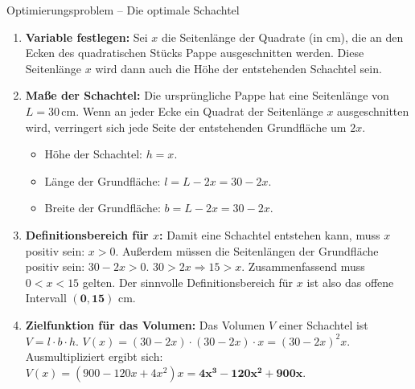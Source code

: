 \begin{loesungsumgebung}{Optimierungsproblem – Die optimale Schachtel}

\begin{enumerate}
    \item \textbf{Variable festlegen:}
    Sei $x$ die Seitenlänge der Quadrate (in cm), die an den Ecken des quadratischen Stücks Pappe ausgeschnitten werden. Diese Seitenlänge $x$ wird dann auch die Höhe der entstehenden Schachtel sein.

    \item \textbf{Maße der Schachtel:}
    Die ursprüngliche Pappe hat eine Seitenlänge von $L=30\,$cm. Wenn an jeder Ecke ein Quadrat der Seitenlänge $x$ ausgeschnitten wird, verringert sich jede Seite der entstehenden Grundfläche um $2x$.
    \begin{itemize}
        \item Höhe der Schachtel: $h = x$.
        \item Länge der Grundfläche: $l = L - 2x = 30 - 2x$.
        \item Breite der Grundfläche: $b = L - 2x = 30 - 2x$.
    \end{itemize}

    \item \textbf{Definitionsbereich für $x$:}
    Damit eine Schachtel entstehen kann, muss $x$ positiv sein: $x > 0$.
    Außerdem müssen die Seitenlängen der Grundfläche positiv sein: $30 - 2x > 0$.
    $30 > 2x \Rightarrow 15 > x$.
    Zusammenfassend muss $0 < x < 15$ gelten. Der sinnvolle Definitionsbereich für $x$ ist also das offene Intervall $\mathbf{(0, 15)}$ cm.

    \item \textbf{Zielfunktion für das Volumen:}
    Das Volumen $V$ einer Schachtel ist $V = l \cdot b \cdot h$.
    $V(x) = (30-2x) \cdot (30-2x) \cdot x = (30-2x)^2 x$.
    Ausmultipliziert ergibt sich:
    $V(x) = (900 - 120x + 4x^2)x = \mathbf{4x^3 - 120x^2 + 900x}$.


\end{enumerate}
\end{loesungsumgebung}
